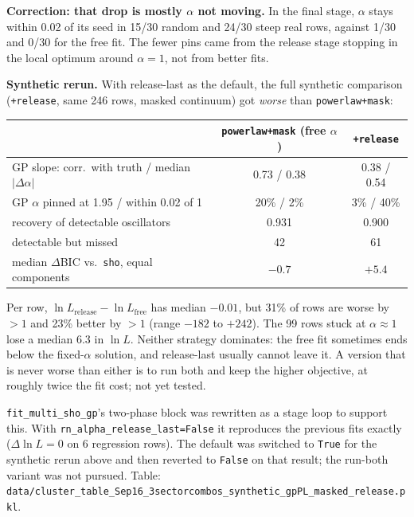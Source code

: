 \documentclass[11pt]{article}
\newcommand{\code}[1]{\texttt{#1}}
\begin{document}
\textbf{Correction: that drop is mostly $\alpha$ not moving.} In the final stage, $\alpha$
stays within 0.02 of its seed in 15/30 random and 24/30 steep real rows, against 1/30 and
0/30 for the free fit. The fewer pins came from the release stage stopping in the local
optimum around $\alpha = 1$, not from better fits.

\textbf{Synthetic rerun.} With release-last as the default, the full synthetic comparison
(\code{+release}, same 246 rows, masked continuum) got \emph{worse} than
\code{powerlaw+mask}:

\begin{center}
\begin{tabular}{lcc}
\toprule
 & \code{powerlaw+mask} (free $\alpha$) & \code{+release} \\
\midrule
GP slope: corr.\ with truth / median $|\Delta\alpha|$ & 0.73 / 0.38 & 0.38 / 0.54 \\
GP $\alpha$ pinned at 1.95 / within 0.02 of 1          & 20\% / 2\%  & 3\% / 40\% \\
recovery of detectable oscillators                    & 0.931       & 0.900 \\
detectable but missed                                 & 42          & 61 \\
median $\Delta$BIC vs.\ \code{sho}, equal components  & $-0.7$      & $+5.4$ \\
\bottomrule
\end{tabular}
\end{center}

Per row, $\ln L_\mathrm{release} - \ln L_\mathrm{free}$ has median $-0.01$, but 31\% of rows are
worse by $>1$ and 23\% better by $>1$ (range $-182$ to $+242$). The 99 rows stuck at
$\alpha\approx1$ lose a median 6.3 in $\ln L$. Neither strategy dominates: the free fit
sometimes ends below the fixed-$\alpha$ solution, and release-last usually cannot leave
it. A version that is never worse than either is to run both and keep the higher objective,
at roughly twice the fit cost; not yet tested.

\code{fit\_multi\_sho\_gp}'s two-phase block was rewritten as a stage loop to support this.
With \code{rn\_alpha\_release\_last=False} it reproduces the previous fits exactly
($\Delta\ln L = 0$ on 6 regression rows). The default was switched to \texttt{True} for the
synthetic rerun above and then reverted to \texttt{False} on that result; the run-both
variant was not pursued. Table:
\code{data/cluster\_table\_Sep16\_3sectorcombos\_synthetic\_gpPL\_masked\_release.pkl}.
\end{document}
